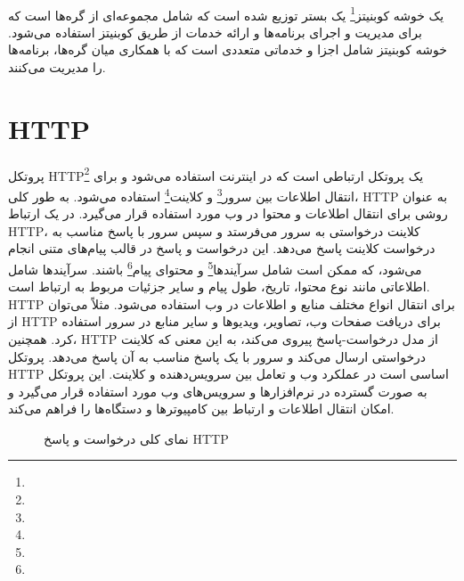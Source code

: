 \paragraph{}
{
    یک خوشه کوبنیتز\footnote{} یک بستر توزیع شده است که شامل مجموعه‌ای از گره‌ها است که برای مدیریت و اجرای برنامه‌ها و ارائه خدمات از طریق کوبنیتز استفاده می‌شود. خوشه کوبنیتز شامل اجزا و خدماتی متعددی است که با همکاری میان گره‌ها، برنامه‌ها را مدیریت می‌کنند.
}

\section{HTTP}
\label{sec:http}
\paragraph{}
{
    پروتکل HTTP\footnote{} یک پروتکل ارتباطی است که در اینترنت استفاده می‌شود و برای انتقال اطلاعات بین سرور\footnote{} و کلاینت\footnote{} استفاده می‌شود. به طور کلی، HTTP به عنوان روشی برای انتقال اطلاعات و محتوا در وب مورد استفاده قرار می‌گیرد. در یک ارتباط HTTP، کلاینت درخواستی به سرور می‌فرستد و سپس سرور با پاسخ مناسب به درخواست کلاینت پاسخ می‌دهد. این درخواست و پاسخ در قالب پیام‌های متنی انجام می‌شود، که ممکن است شامل سرآیندها\footnote{} و محتوای پیام\footnote{} باشند. سرآیندها شامل اطلاعاتی مانند نوع محتوا، تاریخ، طول پیام و سایر جزئیات مربوط به ارتباط است. HTTP برای انتقال انواع مختلف منابع و اطلاعات در وب استفاده می‌شود. مثلاً می‌توان از HTTP برای دریافت صفحات وب، تصاویر، ویدیوها و سایر منابع در سرور استفاده کرد. همچنین، HTTP از مدل درخواست-پاسخ پیروی می‌کند، به این معنی که کلاینت درخواستی ارسال می‌کند و سرور با یک پاسخ مناسب به آن پاسخ می‌دهد. پروتکل HTTP اساسی است در عملکرد وب و تعامل بین سرویس‌دهنده و کلاینت. این پروتکل به صورت گسترده در نرم‌افزارها و سرویس‌های وب مورد استفاده قرار می‌گیرد و امکان انتقال اطلاعات و ارتباط بین کامپیوترها و دستگاه‌ها را فراهم می‌کند.
    \begin{figure}[H]
        \caption{نمای کلی درخواست و پاسخ HTTP}
        \label{fig:http}
    \end{figure}
}

